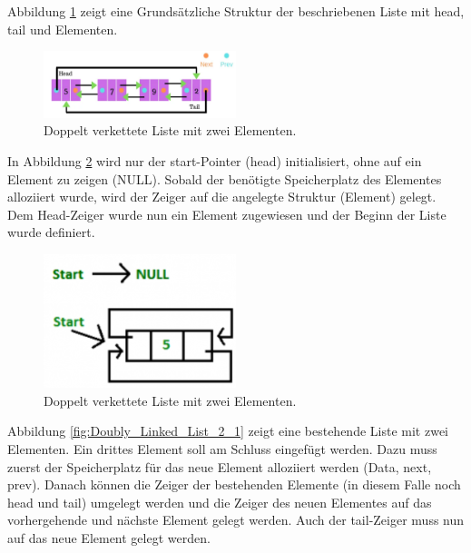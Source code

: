 
Abbildung \ref{fig:Doubly_Linked_List_2_00} zeigt eine Grundsätzliche Struktur der beschriebenen Liste mit head, tail und Elementen.

\begin{figure}[h!]
	\centering
	\includegraphics[width=0.5\textwidth]{graphics/Doubly_Linked_List_2_00}
	\caption{Doppelt verkettete Liste mit zwei Elementen.}
	\label{fig:Doubly_Linked_List_2_00}
\end{figure}


In Abbildung \ref{fig:Doubly_Linked_List_2_0} wird nur der start-Pointer (head) initialisiert, ohne auf ein Element zu zeigen (NULL). Sobald der benötigte Speicherplatz des Elementes alloziiert wurde, wird der Zeiger auf die angelegte Struktur (Element) gelegt. Dem Head-Zeiger wurde nun ein Element zugewiesen und der Beginn der Liste wurde definiert.

\begin{figure}[h!]
	\centering
	\includegraphics[width=0.5\textwidth]{graphics/Doubly_Linked_List_2_0}
	\caption{Doppelt verkettete Liste mit zwei Elementen.}
	\label{fig:Doubly_Linked_List_2_0}
\end{figure}


Abbildung \ref{fig:Doubly_Linked_List_2_1} zeigt eine bestehende Liste mit zwei Elementen. Ein drittes Element soll am Schluss eingefügt werden. Dazu muss zuerst der Speicherplatz für das neue Element alloziiert werden (Data, next, prev). Danach können die Zeiger der bestehenden Elemente (in diesem Falle noch head und tail) umgelegt werden und die Zeiger des neuen Elementes auf das vorhergehende und nächste Element gelegt werden. Auch der tail-Zeiger muss nun auf das neue Element gelegt werden.

